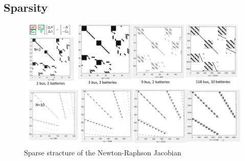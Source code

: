 \documentclass{beamer}
\begin{document}
\subsection{Sparsity}
\begin{frame}
\begin{figure}[!htbp]
\centering
\includegraphics[width=4.1 in , height=2.8 in]{Figures/Sparsity.png}
\caption{Sparse stracture of the Newton-Raphson Jacobian}
\label{sparsity}
\end{figure}
\end{frame}
\end{document}
